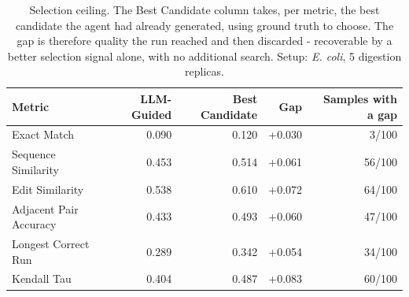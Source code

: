 \begin{table}[!tb]
  \centering
  \caption{Selection ceiling. The Best Candidate column takes, per metric, the best candidate the agent had already generated, using ground truth to choose. The gap is therefore quality the run reached and then discarded - recoverable by a better selection signal alone, with no additional search. Setup: \textnormal{\textnormal{\textit{E. coli}}}, 5 digestion replicas.}
  \label{tab:selection_ceiling_ecoli_r5}
  \begin{tabular}{lrrrr}
    \toprule
    Metric & LLM-Guided & Best Candidate & Gap & Samples with a gap \\
    \midrule
    Exact Match & 0.090 & 0.120 & +0.030 & 3/100 \\
    Sequence Similarity & 0.453 & 0.514 & +0.061 & 56/100 \\
    Edit Similarity & 0.538 & 0.610 & +0.072 & 64/100 \\
    Adjacent Pair Accuracy & 0.433 & 0.493 & +0.060 & 47/100 \\
    Longest Correct Run & 0.289 & 0.342 & +0.054 & 34/100 \\
    Kendall Tau & 0.404 & 0.487 & +0.083 & 60/100 \\
    \bottomrule
  \end{tabular}
\end{table}
